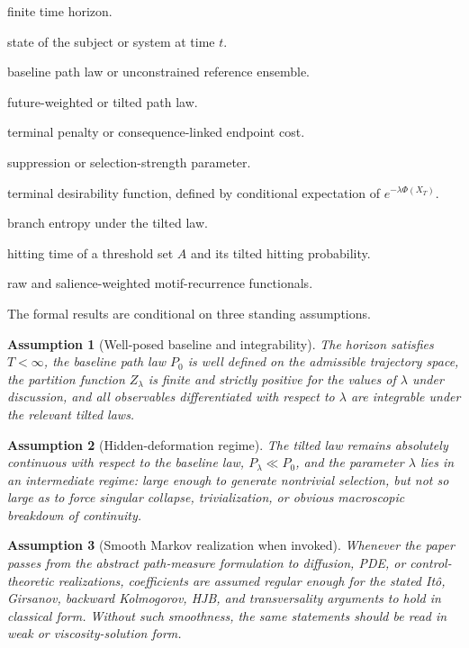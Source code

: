 \documentclass[12pt]{article}
\newtheorem{assumption}{Assumption}
\begin{document}
\begin{description}[leftmargin=2.2cm, style=nextline]
    \item[$T$] finite time horizon.
    \item[$X_t$ or $x(t)$] state of the subject or system at time $t$.
    \item[$P_0$] baseline path law or unconstrained reference ensemble.
    \item[$P_\lambda$] future-weighted or tilted path law.
    \item[$\Phi$] terminal penalty or consequence-linked endpoint cost.
    \item[$\lambda$] suppression or selection-strength parameter.
    \item[$h_\lambda(t,x)$] terminal desirability function, defined by conditional expectation of $e^{-\lambda \Phi(X_T)}$.
    \item[$B_\lambda(t)$] branch entropy under the tilted law.
    \item[$\tau_A$ and $H_\lambda(t,x;A)$] hitting time of a threshold set $A$ and its tilted hitting probability.
    \item[$R_M$ and $Q_s$] raw and salience-weighted motif-recurrence functionals.
\end{description}

The formal results are conditional on three standing assumptions.

\begin{assumption}[Well-posed baseline and integrability]
The horizon satisfies $T<\infty$, the baseline path law $P_0$ is well defined on the admissible trajectory space, the partition function $Z_\lambda$ is finite and strictly positive for the values of $\lambda$ under discussion, and all observables differentiated with respect to $\lambda$ are integrable under the relevant tilted laws.
\end{assumption}

\begin{assumption}[Hidden-deformation regime]
The tilted law remains absolutely continuous with respect to the baseline law, $P_\lambda \ll P_0$, and the parameter $\lambda$ lies in an intermediate regime: large enough to generate nontrivial selection, but not so large as to force singular collapse, trivialization, or obvious macroscopic breakdown of continuity.
\end{assumption}

\begin{assumption}[Smooth Markov realization when invoked]
Whenever the paper passes from the abstract path-measure formulation to diffusion, PDE, or control-theoretic realizations, coefficients are assumed regular enough for the stated It\^o, Girsanov, backward Kolmogorov, HJB, and transversality arguments to hold in classical form. Without such smoothness, the same statements should be read in weak or viscosity-solution form.
\end{assumption}
\end{document}
